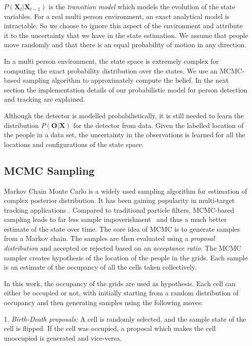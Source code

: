 $P(\textbf{X}_{t}|\textbf{X}_{t-1})$ is the \textit{transition model} which models the evolution of the state variables. For a real multi person environment, an exact analytical model is intractable. So we choose to ignore this aspect of the environment and attribute it to the uncertainty that we have in the state estimation. We assume that people move randomly and that there is an equal probability of motion in any direction. 

In a multi person environment, the state space is extremely complex for computing the exact probability 
distribution over the states. We use an MCMC-based sampling algorithm to approximately compute the belief. In the next section the implementation details of our probabilistic model for person detection and tracking are explained.


Although the detector is modelled probabilistically, it is still needed to learn the distribution $P(\textbf{O}|\textbf{X})$ for the detector from data. Given the labelled location of the people in a data set, the uncertainty in the observations is learned for all the locations and configurations of the state space.



\subsection{MCMC Sampling}
\label{MCMC}
Markov Chain Monte Carlo is a widely used sampling algorithm for estimation of complex posterior distribution. It has been gaining popularity in multi-target tracking applications \cite{khan2004mcmc}. Compared to traditional particle filters, MCMC-based sampling leads to far less sample impoverishment%
~and thus a much better estimate of the state over time. The core idea of MCMC is to generate samples from a Markov chain. The samples are then evaluated using a \textit{proposal distribution} and accepted or rejected based on an \textit{acceptance ratio}. The MCMC sampler creates hypothesis of the location of the people in the grids. Each sample is an estimate of the occupancy of all the cells taken collectively. 

In this work, the occupancy of the grids are used as hypothesis. Each cell can either be occupied or not, with initially starting from a random distribution of occupancy and then generating samples using the following moves:

1. \textit{Birth-Death proposals:}
A cell is randomly selected, and the sample state of the cell is flipped. If the cell was occupied, a proposal which makes the cell unoccupied is generated and vice-versa.

